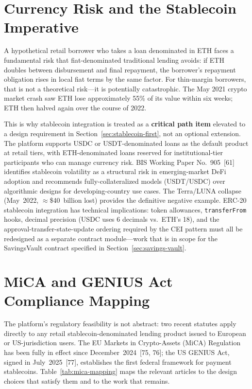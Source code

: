 \documentclass[12pt, a4paper]{report}
\begin{document}
\vspace{2pt}

\section{Currency Risk and the Stablecoin Imperative}

A hypothetical retail borrower who takes a loan denominated in ETH faces a fundamental risk that fiat-denominated traditional lending avoids: if ETH doubles between disbursement and final repayment, the borrower's repayment obligation rises in local fiat terms by the same factor. For thin-margin borrowers, that is not a theoretical risk---it is potentially catastrophic. The May 2021 crypto market crash saw ETH lose approximately 55\% of its value within six weeks; ETH then halved again over the course of 2022.

This is why stablecoin integration is treated as a \textbf{critical path item} elevated to a design requirement in Section~\ref{sec:stablecoin-first}, not an optional extension. The platform supports USDC or USDT-denominated loans as the default product at retail tiers, with ETH-denominated loans reserved for institutional-tier participants who can manage currency risk. BIS Working Paper No.~905~[61] identifies stablecoin volatility as a structural risk in emerging-market DeFi adoption and recommends fully-collateralized models (USDT/USDC) over algorithmic designs for developing-country use cases. The Terra/LUNA collapse (May~2022, $\approx$\$40~billion lost) provides the definitive negative example. ERC-20 stablecoin integration has technical implications: token allowances, \texttt{transferFrom} hooks, decimal precision (USDC uses 6 decimals vs.\ ETH's 18), and the approval-transfer-state-update ordering required by the CEI pattern must all be redesigned as a separate contract module---work that is in scope for the SavingsVault contract specified in Section~\ref{sec:savings-vault}.

\section{MiCA and GENIUS Act Compliance Mapping}
\label{sec:mica-compliance}

The platform's regulatory feasibility is not abstract: two recent statutes apply directly to any retail stablecoin-denominated lending product issued to European or US-jurisdiction users. The EU Markets in Crypto-Assets (MiCA) Regulation has been fully in effect since December~2024~[75, 76]; the US GENIUS Act, signed in July~2025~[77], establishes the first federal framework for payment stablecoins. Table~\ref{tab:mica-mapping} maps the relevant articles to the design choices that satisfy them and to the work that remains.
\end{document}

